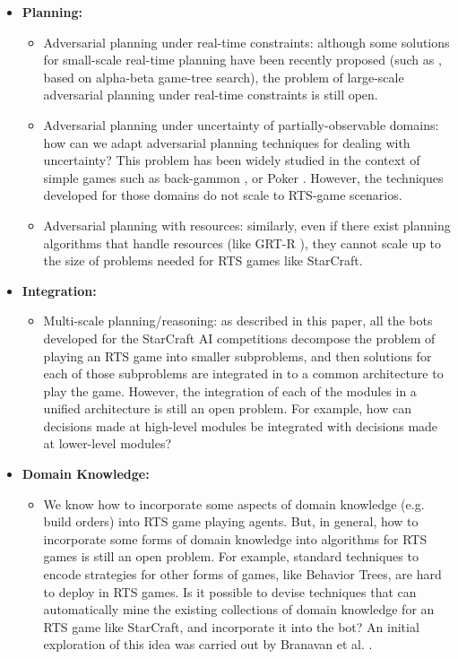 \documentclass[journal]{IEEEtran}
\begin{document}
\begin{itemize}
\item {\bf Planning:}
\begin{itemize}
\item Adversarial planning under real-time constraints: although some solutions for small-scale real-time planning have been recently proposed (such as \cite{churchill2012AIIDE}, based on alpha-beta game-tree search), the problem of large-scale adversarial planning under real-time constraints is still open.
\item Adversarial planning under uncertainty of partially-observable domains: how can we adapt adversarial planning techniques for dealing with uncertainty? This problem has been widely studied in the context of simple games such as back-gammon \cite{tesauro1994td}, or Poker \cite{rubin2011computer}. However, the techniques developed for those domains do not scale to RTS-game scenarios.
\item Adversarial planning with resources: similarly, even if there exist planning algorithms that handle resources (like GRT-R \cite{refanidis2000heuristic}), they cannot scale up to the size of problems needed for RTS games like StarCraft.
\end{itemize}

\item {\bf Integration:}
\begin{itemize}
\item Multi-scale planning/reasoning: as described in this paper, all the bots developed for the StarCraft AI competitions decompose the problem of playing an RTS game into smaller subproblems, and then solutions for each of those subproblems are integrated in to a common architecture to play the game. However, the integration of each of the modules in a unified architecture is still an open problem. For example, how can decisions made at high-level modules be integrated with decisions made at lower-level modules? 
\end{itemize}

\item {\bf Domain Knowledge: }
\begin{itemize}
\item We know how to incorporate some aspects of domain knowledge (e.g. build orders) into RTS game playing agents. But, in general, how to incorporate some forms of domain knowledge into algorithms for RTS games is still an open problem. For example, standard techniques to encode strategies for other forms of games, like Behavior Trees, are hard to deploy in RTS games. Is it possible to devise techniques that can automatically mine the existing collections of domain knowledge for an RTS game like StarCraft, and incorporate it into the bot? An initial exploration of this idea was carried out by Branavan et al. \cite{branavan2011learning}.
\end{itemize}
\end{itemize}
\end{document}
